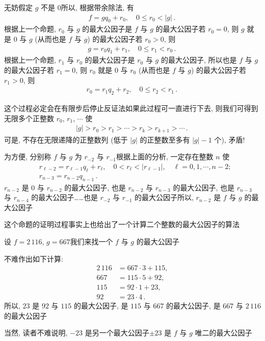 \begin{pf}
    无妨假定 $g$ 不是 $0$\period 所以, 根据带余除法, 有
    \begin{align*}
        f = gq_0 + r_0, \quad 0 \leq r_0 < |g| \period
    \end{align*}
    根据上一个命题, $r_0$ 与 $g$ 的最大公因子是 $f$ 与 $g$ 的最大公因子\period 若 $r_0 = 0$, 则 $g$ 就是 $0$ 与 $g$ (从而也是 $f$ 与 $g$) 的最大公因子\period 若 $r_0 > 0$, 则
    \begin{align*}
        g = r_0 q_1 + r_1, \quad 0 \leq r_1 < r_0 \period
    \end{align*}
    根据上一个命题, $r_1$ 与 $r_0$ 的最大公因子是 $r_0$ 与 $g$ 的最大公因子, 所以也是 $f$ 与 $g$ 的最大公因子\period 若 $r_1 = 0$, 则 $r_0$ 就是 $0$ 与 $r_0$ (从而也是 $f$ 与 $g$) 的最大公因子\period 若 $r_1 > 0$, 则
    \begin{align*}
        r_0 = r_1 q_2 + r_2, \quad 0 \leq r_2 < r_1 \period
    \end{align*}

    这个过程必定会在有限步后停止\period 反证法\period 如果此过程可一直进行下去, 则我们可得到无限多个正整数 $r_0$, $r_1$, $\cdots$ 使
    \begin{align*}
        |g| > r_0 > r_1 > \cdots > r_k > r_{k+1} > \cdots \period
    \end{align*}
    可是, 不存在无限递降的正整数列 (低于 $|g|$ 的正整数至多有 $|g| - 1$ 个), 矛盾!

    为方便, 分别称 $f$ 与 $g$ 为 $r_{-2}$ 与 $r_{-1}$\period 根据上面的分析, 一定存在整数 $n$ 使
    \begin{align*}
         & r_{\ell - 2} = r_{\ell - 1} q_{\ell} + r_{\ell}, \quad 0 < r_{\ell} < |r_{\ell - 1}|, \quad \ell = 0,1,\cdots,n-2; \\
         & r_{n - 3} = r_{n - 2} q_{n - 1} \period
    \end{align*}
    $r_{n-2}$ 是 $0$ 与 $r_{n-2}$ 的最大公因子, 也是 $r_{n-2}$ 与 $r_{n-3}$ 的最大公因子, 也是 $r_{n-3}$ 与 $r_{n-4}$ 的最大公因子……也是 $r_{-2}$ 与 $r_{-1}$ 的最大公因子\period 所以, $r_{n-2}$ 是 $f$ 与 $g$ 的最大公因子\period
\end{pf}

这个命题的证明过程事实上也给出了一个计算二个整数的最大公因子的算法\period

\begin{example}
    设 $f = 2\,116$, $g = 667$\period 我们来找一个 $f$ 与 $g$ 的最大公因子\period

    不难作出如下计算:
    \begin{align*}
        2\,116 & = 667 \cdot 3 + 115, \\
        667    & = 115 \cdot 5 + 92,  \\
        115    & = 92 \cdot 1 + 23,   \\
        92     & = 23 \cdot 4 \period
    \end{align*}
    所以, $23$ 是 $92$ 与 $115$ 的最大公因子, 是 $115$ 与 $667$ 的最大公因子, 是 $667$ 与 $2\,116$ 的最大公因子\period

    当然, 读者不难说明, $-23$ 是另一个最大公因子\period $\pm 23$ 是 $f$ 与 $g$ 唯二的最大公因子\period
\end{example}

